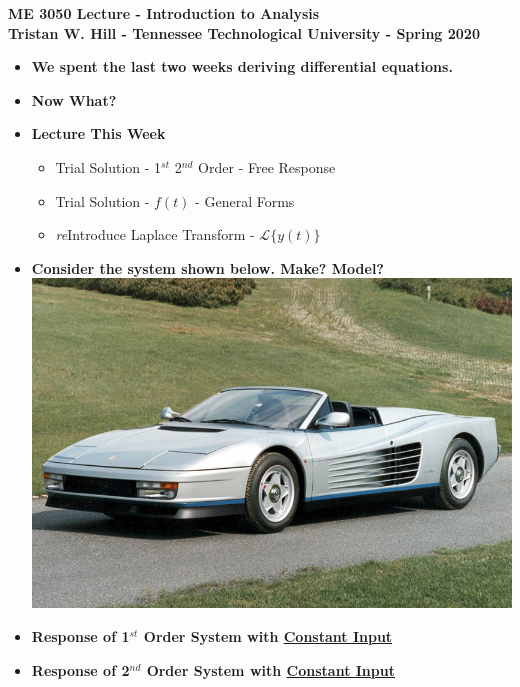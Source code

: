 \documentclass[11pt]{article}
\newcommand{\Lagr}{\mathcal{L}}
\begin{document}
\textbf{ \LARGE ME 3050 Lecture - Introduction to Analysis} \vspace{3mm}\\
\textbf{ \hspace*{5mm}Tristan W. Hill - Tennessee Technological University - Spring 2020 } \vspace{3mm}\\

\begin{itemize}


	\item \textbf{ \LARGE We spent the last two weeks deriving differential equations. } \\

\item \textbf{ \LARGE Now What?}\\
			

\vspace{120mm}
\item \textbf{ \LARGE Lecture This Week}
\Large
\begin{itemize}
	\item Trial Solution - 1$^{st}$ 2$^{nd}$ Order - Free Response\\
	\item Trial Solution - $f(t)$ - General Forms\\
	\item {\it re}Introduce Laplace Transform - $\Lagr\{y(t)\}$
\end{itemize}


	\newpage
\item \textbf{ \LARGE Consider the system shown below. Make? Model?} \vspace{3mm}\\
\includegraphics[scale=0.5]{ferrari.jpg}
	
		

	\newpage
\item \textbf{ \LARGE Response of 1$^{st}$ Order System with \underline{Constant Input}}



	\newpage
\item \textbf{ \LARGE Response of 2$^{nd}$ Order System with \underline{Constant Input}}

	\end{itemize}
\end{document}
